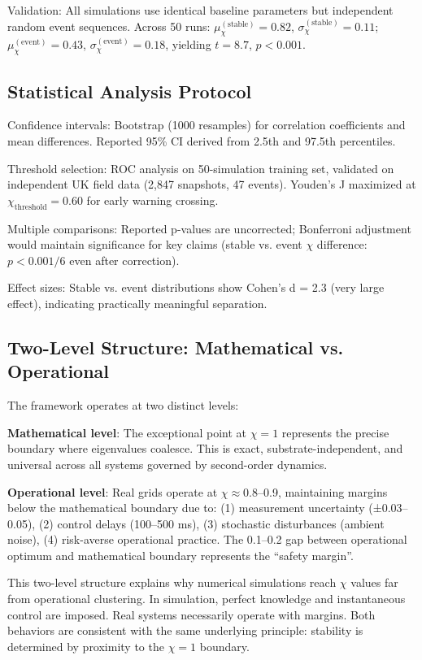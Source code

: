\documentclass[11pt,letterpaper]{article}
\newcommand{\symchi}{\chi}
\begin{document}
Validation: All simulations use identical baseline parameters but independent random event sequences. Across 50 runs: $\mu_\chi^{(\text{stable})} = 0.82$, $\sigma_\chi^{(\text{stable})} = 0.11$; $\mu_\chi^{(\text{event})} = 0.43$, $\sigma_\chi^{(\text{event})} = 0.18$, yielding $t = 8.7$, $p < 0.001$.

\subsection{Statistical Analysis Protocol}

Confidence intervals: Bootstrap (1000 resamples) for correlation coefficients and mean differences. Reported 95\% CI derived from 2.5th and 97.5th percentiles.

Threshold selection: ROC analysis on 50-simulation training set, validated on independent UK field data (2,847 snapshots, 47 events). Youden's J maximized at $\symchi_{\text{threshold}} = 0.60$ for early warning crossing.

Multiple comparisons: Reported p-values are uncorrected; Bonferroni adjustment would maintain significance for key claims (stable vs. event $\chi$ difference: $p < 0.001/6$ even after correction).

Effect sizes: Stable vs. event distributions show Cohen's d = 2.3 (very large effect), indicating practically meaningful separation.

\subsection{Two-Level Structure: Mathematical vs. Operational}

The framework operates at two distinct levels:

\textbf{Mathematical level}: The exceptional point at $\chi = 1$ represents the precise boundary where eigenvalues coalesce. This is exact, substrate-independent, and universal across all systems governed by second-order dynamics.

\textbf{Operational level}: Real grids operate at $\chi \approx 0.8$--0.9, maintaining margins below the mathematical boundary due to: (1) measurement uncertainty (±0.03--0.05), (2) control delays (100--500 ms), (3) stochastic disturbances (ambient noise), (4) risk-averse operational practice. The 0.1--0.2 gap between operational optimum and mathematical boundary represents the ``safety margin''.

This two-level structure explains why numerical simulations reach $\chi$ values far from operational clustering. In simulation, perfect knowledge and instantaneous control are imposed. Real systems necessarily operate with margins. Both behaviors are consistent with the same underlying principle: stability is determined by proximity to the $\chi = 1$ boundary.
\end{document}
